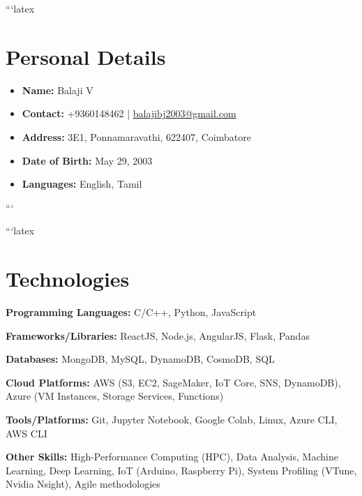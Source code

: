```latex
\section{Personal Details}

\begin{itemize}
    \item \textbf{Name:} Balaji V
    \item \textbf{Contact:} +9360148462 | \href{mailto:balajibj2003@gmail.com}{balajibj2003@gmail.com}
    \item \textbf{Address:} 3E1, Ponnamaravathi, 622407, Coimbatore
    \item \textbf{Date of Birth:} May 29, 2003
    \item \textbf{Languages:} English, Tamil
\end{itemize}

```

```latex
\section{Technologies}
\begin{onecolentry}
\textbf{Programming Languages:} C/C++, Python, JavaScript
\end{onecolentry}
\vspace{0.05 cm}
\begin{onecolentry}
\textbf{Frameworks/Libraries:}  ReactJS, Node.js, AngularJS,  Flask, Pandas
\end{onecolentry}
\vspace{0.05 cm}
\begin{onecolentry}
\textbf{Databases:} MongoDB, MySQL, DynamoDB, CosmoDB, SQL
\end{onecolentry}
\vspace{0.05 cm}
\begin{onecolentry}
\textbf{Cloud Platforms:} AWS (S3, EC2, SageMaker, IoT Core, SNS, DynamoDB), Azure (VM Instances, Storage Services, Functions)
\end{onecolentry}
\vspace{0.05 cm}
\begin{onecolentry}
\textbf{Tools/Platforms:}  Git, Jupyter Notebook, Google Colab,  Linux,  Azure CLI, AWS CLI
\end{onecolentry}
\vspace{0.05 cm}
\begin{onecolentry}
\textbf{Other Skills:}  High-Performance Computing (HPC),  Data Analysis, Machine Learning, Deep Learning, IoT (Arduino, Raspberry Pi), System Profiling (VTune, Nvidia Nsight), Agile methodologies
\end{onecolentry}

